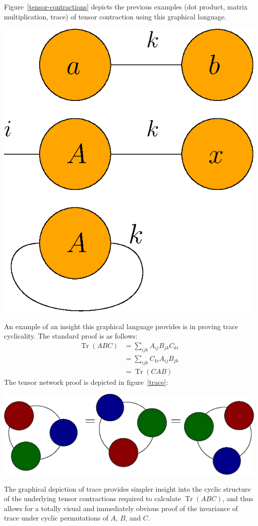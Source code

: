 \documentclass[12pt]{article}
\DeclareMathOperator{\Tr}{Tr}
\newenvironment{Figure}
  {\par\medskip\noindent\minipage{\linewidth}}
  {\endminipage\par\medskip}
\begin{document}
\begin{multicols}{2}
	Figure~\ref{tensor-contractions} depicts the previous examples (dot
	product, matrix multiplication, trace) of tensor contraction using
	this graphical language.
	\begin{Figure}
		\center\includegraphics[width=.35\textwidth]{./Figures/contractions.eps}
		\label{tensor-contractions}
	\end{Figure}
	An example of an insight this graphical language provides is in
	proving trace cyclicality. The standard proof is as follows:
	\begin{align*}
		\Tr(ABC)&=\sum_{ijk}A_{ij}B_{jk}C_{ki}\\
						&=\sum_{ijk}C_{ki}A_{ij}B_{jk}\\
						&=\Tr(CAB)
	\end{align*}
	The tensor network proof is depicted in figure~\ref{trace}:
	\begin{Figure}
		\center\includegraphics[width=.7\textwidth]{./Figures/trace.eps}
		\label{trace}
	\end{Figure}
	The graphical depiction of trace provides simpler insight into the
	cyclic structure of the underlying tensor contractions required to
	calculate $\Tr(ABC)$, and thus allows for a totally visual and
	immediately obvious proof of the invariance of trace under
	cyclic permutations of $A$, $B$, and $C$.




\end{multicols}
\end{document}
